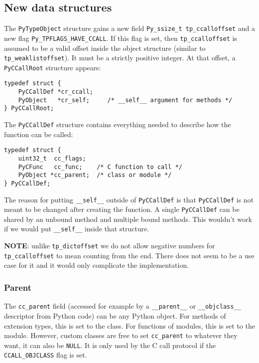 \subsection{New data structures}

The \texttt{PyTypeObject} structure gains a new field
\texttt{Py\_ssize\_t\ tp\_ccalloffset} and a new flag
\texttt{Py\_TPFLAGS\_HAVE\_CCALL}. If this flag is set, then
\texttt{tp\_ccalloffset} is assumed to be a valid offset inside the
object structure (similar to \texttt{tp\_weaklistoffset}). It must be a
strictly positive integer. At that offset, a \texttt{PyCCallRoot}
structure appears:

\begin{verbatim}
typedef struct {
    PyCCallDef *cr_ccall;
    PyObject   *cr_self;     /* __self__ argument for methods */
} PyCCallRoot;
\end{verbatim}

The \texttt{PyCCallDef} structure contains everything needed to describe
how the function can be called:

\begin{verbatim}
typedef struct {
    uint32_t  cc_flags;
    PyCFunc   cc_func;    /* C function to call */
    PyObject *cc_parent;  /* class or module */
} PyCCallDef;
\end{verbatim}

The reason for putting \texttt{\_\_self\_\_} outside of
\texttt{PyCCallDef} is that \texttt{PyCCallDef} is not meant to be
changed after creating the function. A single \texttt{PyCCallDef} can be
shared by an unbound method and multiple bound methods. This wouldn't
work if we would put \texttt{\_\_self\_\_} inside that structure.

\textbf{NOTE}: unlike \texttt{tp\_dictoffset} we do not allow negative
numbers for \texttt{tp\_ccalloffset} to mean counting from the end.
There does not seem to be a use case for it and it would only complicate
the implementation.

\subsubsection{Parent}

The \texttt{cc\_parent} field (accessed for example by a
\texttt{\_\_parent\_\_} or \texttt{\_\_objclass\_\_} descriptor from
Python code) can be any Python object. For methods of extension types,
this is set to the class. For functions of modules, this is set to the
module. However, custom classes are free to set \texttt{cc\_parent} to
whatever they want, it can also be \texttt{NULL}. It is only used by the
C call protocol if the \texttt{CCALL\_OBJCLASS} flag is set.

